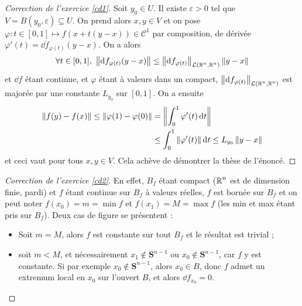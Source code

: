 \begin{proof}[Correction de l'exercice \ref{cd1}]
    Soit $y_0\in U$. 
    Il existe $\varepsilon >0$ tel que $V=B(y_0,\varepsilon)\subseteq U$. 
    On prend alors $x,y\in V$ et on pose $\varphi:t\in[0,1]\mapsto f(x+t(y-x)) \in \mathcal C^1$ par composition,
    de dérivée $\varphi'(t)=\dd f_{\varphi(t)}(y-x)$. 
    On a alors
    \[
        \forall t\in[0,1],\ \left\lVert \operatorname{d\hskip-1.5pt} f_{\varphi(t)}(y-x)\right\rVert\leq\left\lVert \operatorname{d\hskip-1.5pt} f_{\varphi(t)}\right\rVert_{\mathcal L(\operatorname{\mathbb R}^n,\operatorname{\mathbb R}^n)}\left\lVert y-x\right\rVert
    \]
    et $\dd f$ étant continue, et $\varphi$ étant à valeurs dans un compact, $\left\lVert \operatorname{d\hskip-1.5pt} f_{\varphi(t)}\right\rVert_{\mathcal L(\operatorname{\mathbb R}^n,\operatorname{\mathbb R}^n)}$ 
    est majorée par une constante $L_{y_0}$ sur $[0,1]$.
    On a ensuite 
    \begin{align*}
        \left\lVert f(y)-f(x)\right\rVert\leq\left\lVert \varphi(1)-\varphi(0)\right\rVert&=\left\lVert \int_0^1\varphi'(t)\operatorname{d\hskip-1.5pt} t\right\rVert\\ &\leq\int_0^1\left\lVert \varphi'(t)\right\rVert\operatorname{d\hskip-1.5pt} t\leq L_{y_0}\left\lVert y-x\right\rVert
    \end{align*}
    et ceci vaut pour tous $x,y\in V$. 
    Cela achève de démontrer la thèse de l'énoncé.
\end{proof}

\begin{proof}[Correction de l'exercice \ref{cd2}]
    En effet, $B_f$ étant compact ($\operatorname{\mathbb R}^n$ est de dimension finie, pardi) et $f$ étant continue sur $B_f$ à valeurs réelles,
    $f$ est bornée sur $B_f$ et on peut noter $f(x_0)=m=\min f$ et $f(x_1)=M=\max f$ (les min et max étant pris sur $B_f$).
    Deux cas de figure se présentent :
    \begin{itemize}
        \item Soit $m = M$, alors $f$ est constante sur tout $B_f$ et le résultat est trivial ;
        \item soit $m<M$, et nécessairement $x_1\notin \mathbf S^{n-1}$ ou $x_0\notin \mathbf S^{n-1}$, car $f$ y est constante. 
        Si par exemple $x_0\notin\mathbf S^{n-1}$, alors $x_0\in B$, donc $f$ admet un extremum local en $x_0$ sur l'ouvert $B$, et alors $\dd f_{x_0}=0$.
    \end{itemize}
\end{proof}